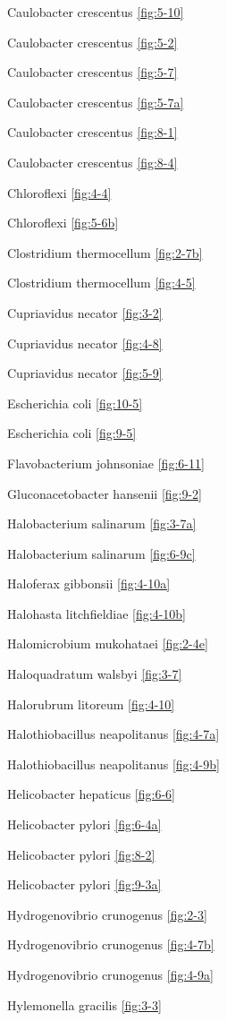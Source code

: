 \documentclass[]{tufte-book}
\begin{document}
Caulobacter crescentus \ref{fig:5-10}

Caulobacter crescentus \ref{fig:5-2}

Caulobacter crescentus \ref{fig:5-7}

Caulobacter crescentus \ref{fig:5-7a}

Caulobacter crescentus \ref{fig:8-1}

Caulobacter crescentus \ref{fig:8-4}

Chloroflexi \ref{fig:4-4}

Chloroflexi \ref{fig:5-6b}

Clostridium thermocellum \ref{fig:2-7b}

Clostridium thermocellum \ref{fig:4-5}

Cupriavidus necator \ref{fig:3-2}

Cupriavidus necator \ref{fig:4-8}

Cupriavidus necator \ref{fig:5-9}

Escherichia coli \ref{fig:10-5}

Escherichia coli \ref{fig:9-5}

Flavobacterium johnsoniae \ref{fig:6-11}

Gluconacetobacter hansenii \ref{fig:9-2}

Halobacterium salinarum \ref{fig:3-7a}

Halobacterium salinarum \ref{fig:6-9c}

Haloferax gibbonsii \ref{fig:4-10a}

Halohasta litchfieldiae \ref{fig:4-10b}

Halomicrobium mukohataei \ref{fig:2-4e}

Haloquadratum walsbyi \ref{fig:3-7}

Halorubrum litoreum \ref{fig:4-10}

Halothiobacillus neapolitanus \ref{fig:4-7a}

Halothiobacillus neapolitanus \ref{fig:4-9b}

Helicobacter hepaticus \ref{fig:6-6}

Helicobacter pylori \ref{fig:6-4a}

Helicobacter pylori \ref{fig:8-2}

Helicobacter pylori \ref{fig:9-3a}

Hydrogenovibrio crunogenus \ref{fig:2-3}

Hydrogenovibrio crunogenus \ref{fig:4-7b}

Hydrogenovibrio crunogenus \ref{fig:4-9a}

Hylemonella gracilis \ref{fig:3-3}
\end{document}
